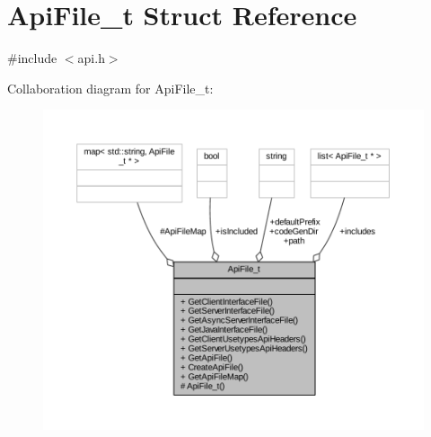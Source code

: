 \hypertarget{struct_api_file__t}{}\section{Api\+File\+\_\+t Struct Reference}
\label{struct_api_file__t}


{\ttfamily \#include $<$api.\+h$>$}



Collaboration diagram for Api\+File\+\_\+t\+:
\nopagebreak
\begin{figure}[H]
\begin{center}
\leavevmode
\includegraphics[width=350pt]{struct_api_file__t__coll__graph}
\end{center}
\end{figure}
